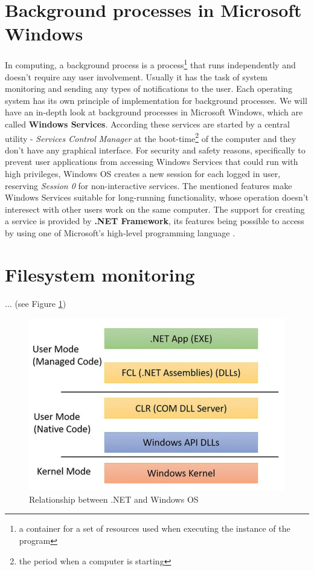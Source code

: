 \section{Background processes in Microsoft Windows}
\label{section:backgroundProc}
In computing, a background process is a process\footnote{a container for a set of resources used when executing the instance of the program} that runs independently and doesn't require any user involvement. Usually it has the task of system monitoring and sending any types of notifications to the user. Each operating system has its own principle of implementation for background processes. We will have an in-depth look at background processes in Microsoft Windows, which are called \textbf{Windows Services}. According \cite{winInternals} these services are started by a central utility - \textit{Services Control Manager} at the boot-time\footnote{the period when a computer is starting} of the computer and they don't have any graphical interface. For security and safety reasons, specifically to prevent user applications from accessing Windows Services that could run with high privileges, Windows OS creates a new session for each logged in user, reserving \textit{Session 0} for non-interactive services. The mentioned features make Windows Services suitable for long-running functionality, whose operation doesn't interesect with other users work on the same computer. The support for creating a service is provided by \textbf{.NET Framework}, its features being possible to access by using one of Microsoft's high-level programming language \CSharp.

\section{Filesystem monitoring}
\label{section:filesystem}

$\ldots$ (see Figure \ref{netFramework})

\begin{figure}[ht]
	\centerline{\includegraphics[scale=0.5]{figures/NetFramework.png}}  
	\caption{Relationship between .NET and Windows OS \cite{winInternals}}
	\label{netFramework}
\end{figure}


